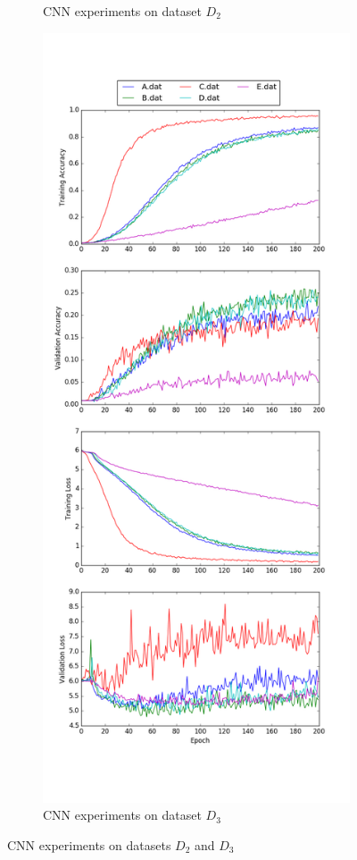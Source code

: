 \begin{figure}[H]
\begin{subfigure}[b]{0.4\linewidth}
		\caption{CNN experiments on dataset $D_{2}$}
		\label{fig:cnn_d2}
	\end{subfigure}
	\begin{subfigure}[b]{0.4\linewidth}
		\includegraphics[width=\linewidth]{sections/imgs/cnn/cnn_dataset3.png}
		\caption{CNN experiments on dataset $D_{3}$}
		\label{fig:cnn_d3}
	\end{subfigure}
	
	\caption{CNN experiments on datasets $D_{2}$ and $D_{3}$}
\end{figure}